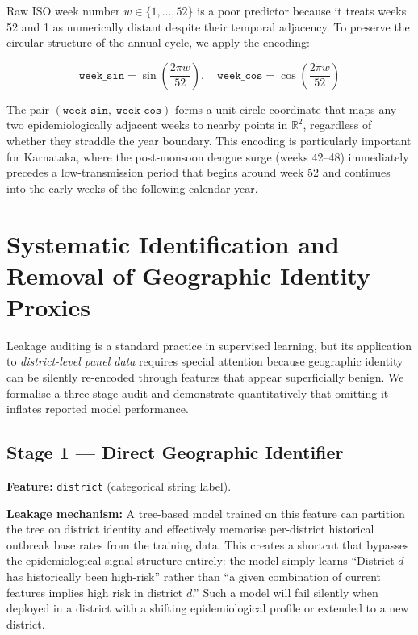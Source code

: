 \documentclass[conference]{IEEEtran}
\begin{document}
Raw ISO week number $w \in \{1, \ldots, 52\}$ is a poor predictor
because it treats weeks 52 and 1 as numerically distant despite
their temporal adjacency. To preserve the circular structure of the
annual cycle, we apply the encoding:

\begin{equation}
  \texttt{week\_sin} = \sin\!\left(\frac{2\pi w}{52}\right),
  \quad
  \texttt{week\_cos} = \cos\!\left(\frac{2\pi w}{52}\right)
  \label{eq:seasonality}
\end{equation}

The pair $(\texttt{week\_sin},\; \texttt{week\_cos})$ forms a
unit-circle coordinate that maps any two epidemiologically
adjacent weeks to nearby points in $\mathbb{R}^2$, regardless of
whether they straddle the year boundary. This encoding is
particularly important for Karnataka, where the post-monsoon dengue
surge (weeks 42--48) immediately precedes a low-transmission period
that begins around week 52 and continues into the early weeks of the
following calendar year.

\section{Systematic Identification and Removal of Geographic
         Identity Proxies}
\label{sec:leakage}

Leakage auditing is a standard practice in supervised learning, but
its application to \emph{district-level panel data} requires special
attention because geographic identity can be silently re-encoded
through features that appear superficially benign. We formalise a
three-stage audit and demonstrate quantitatively that omitting it
inflates reported model performance.

\subsection{Stage 1 --- Direct Geographic Identifier}

\textbf{Feature:} \texttt{district} (categorical string label).

\textbf{Leakage mechanism:} A tree-based model trained on this
feature can partition the tree on district identity and effectively
memorise per-district historical outbreak base rates from the
training data. This creates a shortcut that bypasses the epidemiological
signal structure entirely: the model simply learns ``District $d$ has
historically been high-risk'' rather than ``a given combination of
current features implies high risk in district $d$.'' Such a model
will fail silently when deployed in a district with a shifting
epidemiological profile or extended to a new district.
\end{document}
